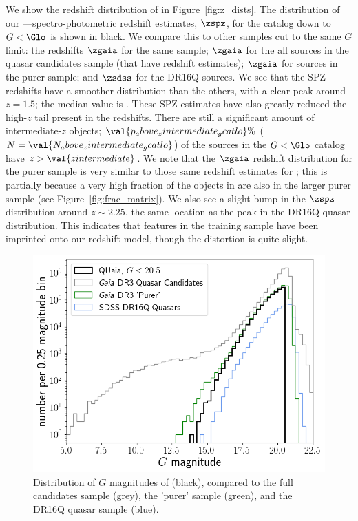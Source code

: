 We show the redshift distribution of \cat in Figure~\ref{fig:z_dists}.
The distribution of our \Gaia--\unWISE--\SDSS spectro-photometric redshift estimates, $\zspz$, for the catalog down to $G<\Glo$ is shown in black.
We compare this to other samples cut to the same $G$ limit: the \Gaia redshifts $\zgaia$ for the same sample; $\zgaia$ for the all sources in the \Gaia quasar candidates sample (that have redshift  estimates); $\zgaia$ for sources in the purer \Gaia sample; and $\zsdss$ for the \SDSS DR16Q sources.
We see that the SPZ redshifts have a smoother distribution than the others, with a clear peak around $z=1.5$; the median value is .
These SPZ estimates have also greatly reduced the high-$z$ tail present in the \Gaia redshifts.
There are still a significant amount of intermediate-$z$ objects; $\val{p_above_zintermediate_gcatlo}\%$ ($N=\val{N_above_zintermediate_gcatlo}$) of the sources in the $G<\Glo$ catalog have $z>\val{zintermediate}$.
We note that the $\zgaia$ redshift distribution for the purer sample is very similar to those same redshift estimates for \cat; this is partially because a very high fraction of the objects in \cat are also in the larger \Gaia purer sample (see Figure~\ref{fig:frac_matrix}).
We also see a slight bump in the $\zspz$ distribution around $z\sim2.25$, the same location as the peak in the \SDSS DR16Q quasar distribution.
This indicates that features in the training sample have been imprinted onto our redshift model, though the distortion is quite slight.

\begin{figure}
    \centering
    \includegraphics[width=0.6\columnwidth]{G_dist}
    \caption{Distribution of $G$ magnitudes of \cat (black), compared to the full \Gaia candidates sample (grey), the {\Gaia} 'purer' sample (green), and the \SDSS DR16Q quasar sample (blue).}
    \label{fig:G_dist}
\end{figure}


